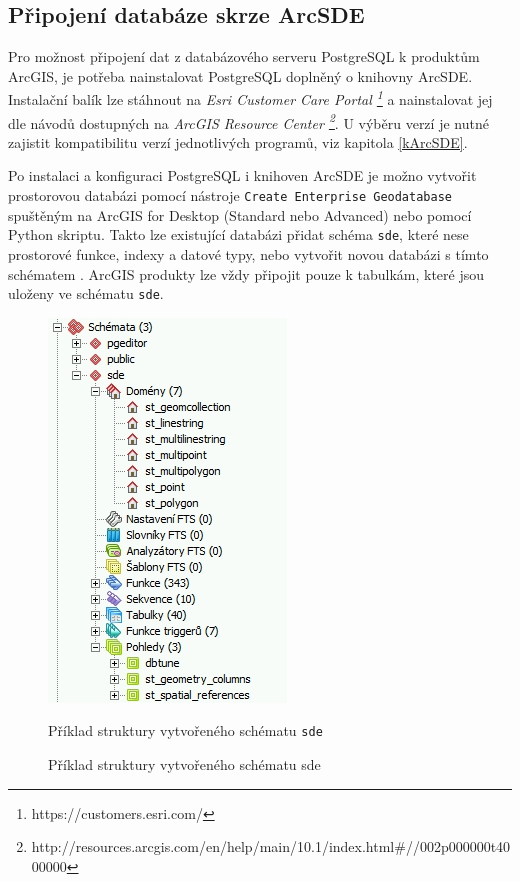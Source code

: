 \subsection{Připojení databáze skrze ArcSDE}

Pro možnost připojení dat z databázového serveru PostgreSQL k produktům ArcGIS,
je potřeba nainstalovat PostgreSQL doplněný o knihovny ArcSDE. Instalační balík
lze stáhnout na {\it Esri Customer Care Portal
\footnote{https://customers.esri.com/}} a nainstalovat jej dle návodů dostupných na
{\it ArcGIS Resource Center
\footnote{http://resources.arcgis.com/en/help/main/10.1/index.html\#//002p000000t4000000}}.
U výběru verzí je nutné zajistit kompatibilitu verzí jednotlivých programů, viz kapitola \ref{kArcSDE}.

Po instalaci a konfiguraci PostgreSQL i knihoven ArcSDE je možno vytvořit
prostorovou databázi pomocí nástroje \texttt{Create Enterprise Geodatabase}
spuštěným na ArcGIS for Desktop (Standard nebo Advanced) nebo pomocí Python
skriptu. Takto lze existující databázi přidat schéma \texttt{sde}, které nese prostorové
funkce, indexy a datové typy, nebo vytvořit novou databázi s tímto schématem
. ArcGIS produkty lze vždy připojit pouze k tabulkám, které jsou
uloženy ve schématu \texttt{sde}. 

  \begin{figure}[H]
    \centering
    \includegraphics[scale=0.6]{../../../grafy/obr/sde_schema.png}
    \caption{Příklad struktury vytvořeného schématu sde}{Příklad struktury vytvořeného schématu \texttt{sde}}
          \label{o}
  \end{figure}

